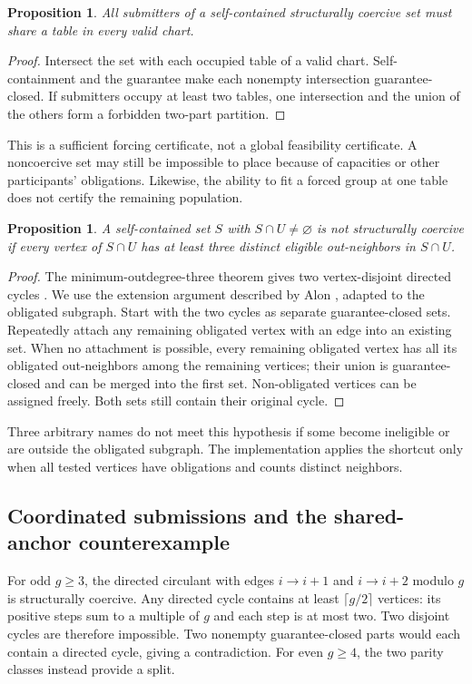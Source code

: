 \documentclass[11pt,a4paper]{article}
\newtheorem{proposition}[theorem]{Proposition}
\theoremstyle{definition}\newtheorem{definition}[theorem]{Definition}
\theoremstyle{remark}\newtheorem{remark}[theorem]{Remark}
\begin{document}
\begin{proposition}\label{prop:forcing}
All submitters of a self-contained structurally coercive set must share a table in every valid chart.
\end{proposition}
\begin{proof}
Intersect the set with each occupied table of a valid chart. Self-containment and the guarantee make each nonempty intersection guarantee-closed. If submitters occupy at least two tables, one intersection and the union of the others form a forbidden two-part partition.
\end{proof}
This is a sufficient forcing certificate, not a global feasibility certificate. A noncoercive set may still be impossible to place because of capacities or other participants' obligations. Likewise, the ability to fit a forced group at one table does not certify the remaining population.

\begin{proposition}\label{prop:three}
A self-contained set $S$ with $S\cap U\ne\varnothing$ is not structurally coercive if every vertex of $S\cap U$ has at least three distinct eligible out-neighbors in $S\cap U$.
\end{proposition}
\begin{proof}
The minimum-outdegree-three theorem gives two vertex-disjoint directed cycles \citep{thomassen1983}. We use the extension argument described by Alon \citep{aloncoalitions}, adapted to the obligated subgraph. Start with the two cycles as separate guarantee-closed sets. Repeatedly attach any remaining obligated vertex with an edge into an existing set. When no attachment is possible, every remaining obligated vertex has all its obligated out-neighbors among the remaining vertices; their union is guarantee-closed and can be merged into the first set. Non-obligated vertices can be assigned freely. Both sets still contain their original cycle.
\end{proof}
Three arbitrary names do not meet this hypothesis if some become ineligible or are outside the obligated subgraph. The implementation applies the shortcut only when all tested vertices have obligations and counts distinct neighbors.

\subsection{Coordinated submissions and the shared-anchor counterexample}
For odd $g\ge3$, the directed circulant with edges $i\to i+1$ and $i\to i+2$ modulo $g$ is structurally coercive. Any directed cycle contains at least $\lceil g/2\rceil$ vertices: its positive steps sum to a multiple of $g$ and each step is at most two. Two disjoint cycles are therefore impossible. Two nonempty guarantee-closed parts would each contain a directed cycle, giving a contradiction. For even $g\ge4$, the two parity classes instead provide a split.
\end{document}
